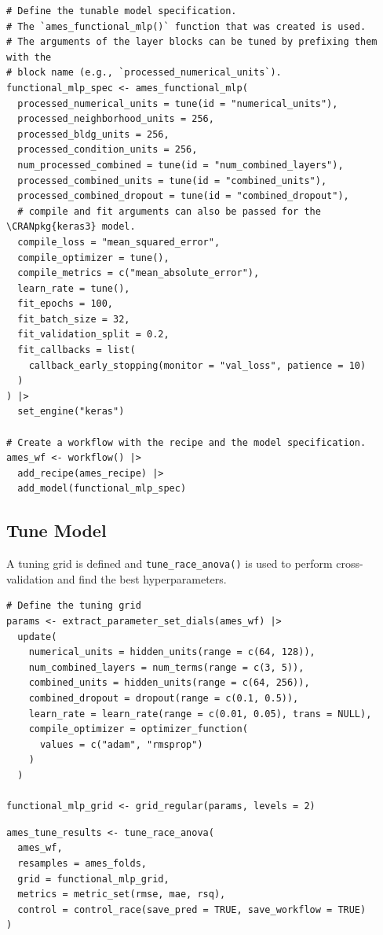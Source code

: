 \begin{verbatim}
# Define the tunable model specification.
# The `ames_functional_mlp()` function that was created is used.
# The arguments of the layer blocks can be tuned by prefixing them with the
# block name (e.g., `processed_numerical_units`).
functional_mlp_spec <- ames_functional_mlp(
  processed_numerical_units = tune(id = "numerical_units"),
  processed_neighborhood_units = 256,
  processed_bldg_units = 256,
  processed_condition_units = 256,
  num_processed_combined = tune(id = "num_combined_layers"),
  processed_combined_units = tune(id = "combined_units"),
  processed_combined_dropout = tune(id = "combined_dropout"),
  # compile and fit arguments can also be passed for the \CRANpkg{keras3} model.
  compile_loss = "mean_squared_error",
  compile_optimizer = tune(),
  compile_metrics = c("mean_absolute_error"),
  learn_rate = tune(),
  fit_epochs = 100,
  fit_batch_size = 32,
  fit_validation_split = 0.2,
  fit_callbacks = list(
    callback_early_stopping(monitor = "val_loss", patience = 10)
  )
) |>
  set_engine("keras")

# Create a workflow with the recipe and the model specification.
ames_wf <- workflow() |>
  add_recipe(ames_recipe) |>
  add_model(functional_mlp_spec)
\end{verbatim}

\subsection{Tune Model}\label{tune-model}

A tuning grid is defined and \texttt{tune\_race\_anova()} is used to perform cross-validation and find the best hyperparameters.

\begin{verbatim}
# Define the tuning grid
params <- extract_parameter_set_dials(ames_wf) |>
  update(
    numerical_units = hidden_units(range = c(64, 128)),
    num_combined_layers = num_terms(range = c(3, 5)),
    combined_units = hidden_units(range = c(64, 256)),
    combined_dropout = dropout(range = c(0.1, 0.5)),
    learn_rate = learn_rate(range = c(0.01, 0.05), trans = NULL),
    compile_optimizer = optimizer_function(
      values = c("adam", "rmsprop")
    )
  )

functional_mlp_grid <- grid_regular(params, levels = 2)
\end{verbatim}

\begin{verbatim}
ames_tune_results <- tune_race_anova(
  ames_wf,
  resamples = ames_folds,
  grid = functional_mlp_grid,
  metrics = metric_set(rmse, mae, rsq),
  control = control_race(save_pred = TRUE, save_workflow = TRUE)
)
\end{verbatim}

